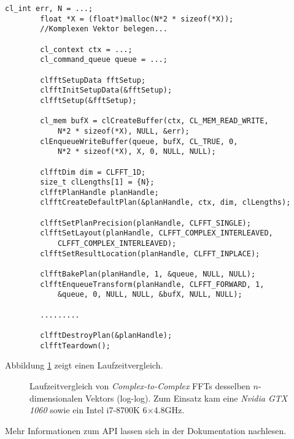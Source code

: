 		\begin{lstlisting}[caption=clFFT Beispiel]
		cl_int err, N = ...;
		float *X = (float*)malloc(N*2 * sizeof(*X));
		//Komplexen Vektor belegen...
		
		cl_context ctx = ...;
		cl_command_queue queue = ...;
		
		clfftSetupData fftSetup;
		clfftInitSetupData(&fftSetup);
		clfftSetup(&fftSetup);

		cl_mem bufX = clCreateBuffer(ctx, CL_MEM_READ_WRITE, 
			N*2 * sizeof(*X), NULL, &err);
		clEnqueueWriteBuffer(queue, bufX, CL_TRUE, 0, 
			N*2 * sizeof(*X), X, 0, NULL, NULL);
		
		clfftDim dim = CLFFT_1D;
		size_t clLengths[1] = {N};
		clfftPlanHandle planHandle;
		clfftCreateDefaultPlan(&planHandle, ctx, dim, clLengths);

		clfftSetPlanPrecision(planHandle, CLFFT_SINGLE);
		clfftSetLayout(planHandle, CLFFT_COMPLEX_INTERLEAVED, 
            CLFFT_COMPLEX_INTERLEAVED);
		clfftSetResultLocation(planHandle, CLFFT_INPLACE);

		clfftBakePlan(planHandle, 1, &queue, NULL, NULL);
		clfftEnqueueTransform(planHandle, CLFFT_FORWARD, 1, 
			&queue, 0, NULL, NULL, &bufX, NULL, NULL);
		
		.........
		
		clfftDestroyPlan(&planHandle);
		clfftTeardown();
		\end{lstlisting}		
		
		Abbildung \ref{fig6:fft} zeigt einen Laufzeitvergleich.	
					
		\begin{figure}[h]
  			\centering
  			\caption[Vergleich von FFTs]{Laufzeitvergleich von \textit{Complex-to-Complex} FFTs desselben $n$-dimensionalen Vektors (log-log). Zum Einsatz kam eine \textit{Nvidia GTX 1060} sowie ein Intel i7-8700K 6$\times$4.8GHz.}
  			\label{fig6:fft}
		\end{figure}
		
		Mehr Informationen zum \Gls{API} lassen sich in der Dokumentation nachlesen. \autocite{clfftDoc}